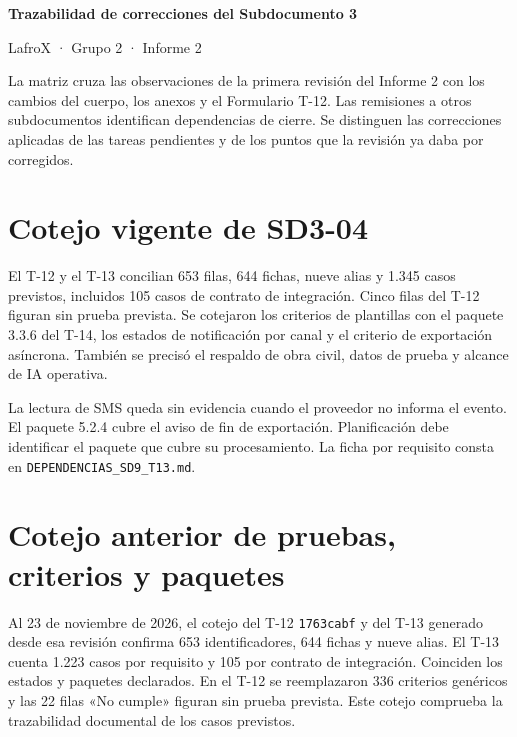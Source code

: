 \documentclass[11pt,letterpaper]{article}
\begin{document}
\begin{center}
  {\Large\bfseries Trazabilidad de correcciones del Subdocumento 3}\par
  LafroX · Grupo 2 · Informe 2
\end{center}

La matriz cruza las observaciones de la primera revisión del Informe 2 con los cambios del cuerpo, los anexos y el Formulario T-12. Las remisiones a otros subdocumentos identifican dependencias de cierre. Se distinguen las correcciones aplicadas de las tareas pendientes y de los puntos que la revisión ya daba por corregidos.



\section*{Cotejo vigente de SD3-04}

El T-12 y el T-13 concilian 653 filas, 644 fichas, nueve alias y 1.345 casos previstos, incluidos 105 casos de contrato de integración. Cinco filas del T-12 figuran sin prueba prevista. Se cotejaron los criterios de plantillas con el paquete 3.3.6 del T-14, los estados de notificación por canal y el criterio de exportación asíncrona. También se precisó el respaldo de obra civil, datos de prueba y alcance de IA operativa.

La lectura de SMS queda sin evidencia cuando el proveedor no informa el evento. El paquete 5.2.4 cubre el aviso de fin de exportación. Planificación debe identificar el paquete que cubre su procesamiento. La ficha por requisito consta en \texttt{DEPENDENCIAS\_SD9\_T13.md}.

\section*{Cotejo anterior de pruebas, criterios y paquetes}

Al 23 de noviembre de 2026, el cotejo del T-12 \texttt{1763cabf} y del T-13 generado desde esa revisión confirma 653 identificadores, 644 fichas y nueve alias. El T-13 cuenta 1.223 casos por requisito y 105 por contrato de integración. Coinciden los estados y paquetes declarados. En el T-12 se reemplazaron 336 criterios genéricos y las 22 filas «No cumple» figuran sin prueba prevista. Este cotejo comprueba la trazabilidad documental de los casos previstos.
\end{document}
